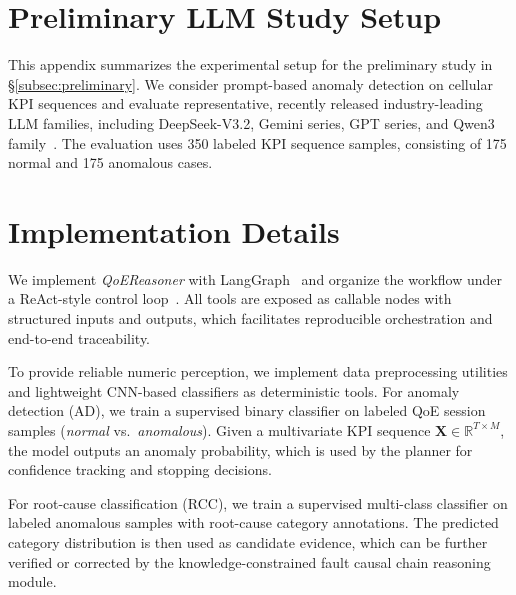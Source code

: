 \documentclass[sigconf,10pt]{acmart} %
\begin{document}




\appendix

\section{Preliminary LLM Study Setup}\label{appen:prelim_llm_setup}
This appendix summarizes the experimental setup for the preliminary study in \S\ref{subsec:preliminary}.
We consider prompt-based anomaly detection on cellular KPI sequences and evaluate representative, recently released industry-leading LLM families, including DeepSeek-V3.2, Gemini series, GPT series, and Qwen3 family~\cite{liu2025deepseek, comanici2025gemini, hurst2024gpt, yang2025qwen3}.
The evaluation uses 350 labeled KPI sequence samples, consisting of 175 normal and 175 anomalous cases.


\section{Implementation Details}
\label{appen:Implementation Details}
We implement \textit{QoEReasoner} with LangGraph~\cite{langgraph2024} and organize the workflow under a ReAct-style control loop~\cite{yao2022react}. All tools are exposed as callable nodes with structured inputs and outputs, which facilitates reproducible orchestration and end-to-end traceability.

To provide reliable numeric perception, we implement data preprocessing utilities and lightweight CNN-based classifiers as deterministic tools. For anomaly detection (AD), we train a supervised binary classifier on labeled QoE session samples (\emph{normal} vs.\ \emph{anomalous}). Given a multivariate KPI sequence $\mathbf{X}\in\mathbb{R}^{T\times M}$, the model outputs an anomaly probability, which is used by the planner for confidence tracking and stopping decisions.

For root-cause classification (RCC), we train a supervised multi-class classifier on labeled anomalous samples with root-cause category annotations. The predicted category distribution is then used as candidate evidence, which can be further verified or corrected by the knowledge-constrained fault causal chain reasoning module.
\end{document}
